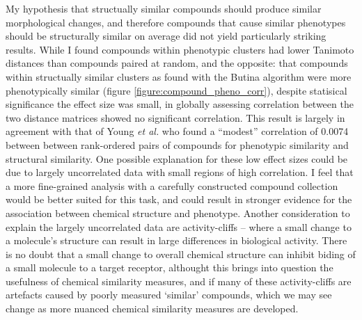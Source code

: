 \documentclass[a4paper,11pt,twoside,openright]{scrbook}
\begin{document}
My hypothesis that structually similar compounds should produce similar morphological changes, and therefore compounds that cause similar phenotypes should be structurally similar on average did not yield particularly striking results.
While I found compounds within phenotypic clusters had lower Tanimoto distances than compounds paired at random, and the opposite: that compounds within structually similar clusters as found with the Butina algorithm were more phenotypically similar (figure \ref{figure:compound_pheno_corr}), despite statisical significance the effect size was small, in globally assessing correlation between the two distance matrices showed no significant correlation.
This result is largely in agreement with that of Young \textit{et al.} who found a ``modest'' correlation of 0.0074 between between rank-ordered pairs of compounds for phenotypic similarity and structural similarity. \cite{Young2008}
One possible explanation for these low effect sizes could be due to largely uncorrelated data with small regions of high correlation.
I feel that a more fine-grained analysis with a carefully constructed compound collection would be better suited for this task, and could result in stronger evidence for the association between chemical structure and phenotype.
Another consideration to explain the largely uncorrelated data are activity-cliffs -- where a small change to a molecule's structure can result in large differences in biological activity.
There is no doubt that a small change to overall chemical structure can inhibit biding of a small molecule to a target receptor, althought this brings into question the usefulness of chemical similarity measures, and if many of these activity-cliffs are artefacts caused by poorly measured `similar' compounds, which we may see change as more nuanced chemical similarity measures are developed.
\end{document}
